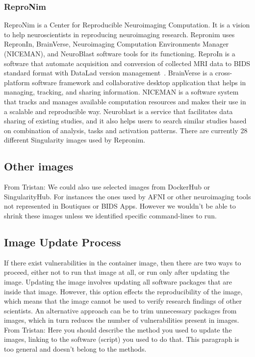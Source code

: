\documentclass[a4paper,num-refs]{oup-contemporary}
\newcommand{\TG}[1]{\color{blue}From Tristan: #1\color{black}}
\begin{document}
\subsubsection{ReproNim}

ReproNim is a Center for Reproducible Neuroimaging Computation. It is a vision
to help neuroscientists in reproducing neuroimaging research. Repronim
uses RepronIn, BrainVerse, Neuroimaging Computation Environments Manager (NICEMAN),
and NeuroBlast software tools for its
functioning. ReproIn is a software that automate acquisition and conversion
of collected MRI data to BIDS standard format with DataLad version management~\cite{kennedy2019everything}.
BrainVerse is a cross-platform software framework and collaborative desktop application
that helps in managing, tracking, and sharing information.
NICEMAN is a software system that tracks and manages available computation resources
and makes their use in a scalable and reproducible way.
Neuroblast is a service that facilitates data sharing of existing studies, and it also
helps users to search similar studies based on combination of analysis,
tasks and activation patterns. There are currently 28 different Singularity
images used by Repronim. 

\subsection{Other images}

\TG{We could also use selected images from DockerHub or SingularityHub. For
instances the ones used by AFNI or other neuroimaging tools not represented
in Boutiques or BIDS Apps. However we wouldn't be able to shrink these
images unless we identified specific command-lines to run.}

\subsection{Image Update Process}

If there exist vulnerabilities in the container image, then there are two ways
to proceed, either not to run that image at all, or run only after updating the
image. Updating the image involves updating all software packages that are
inside that image. However, this option effects the reproducibility
of the image, which means that the image cannot be used to verify research
findings of other scientists. An alternative approach can be to trim unnecessary
packages from images, which in turn reduces the number of vulnerabilities
present in images. \TG{Here you should describe the method you used to update the images, linking to the 
software (script) you used to do that. 
This paragraph is too general and doesn't belong to the methods. }
\end{document}
